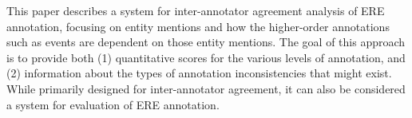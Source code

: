 This paper describes a system for inter-annotator agreement analysis of ERE annotation, focusing on entity mentions and how the higher-order annotations such as  events are dependent on those entity mentions.  The goal of this approach is to provide both (1) quantitative scores for the various levels of annotation, and (2) information about the types of annotation inconsistencies that might exist. While primarily designed for inter-annotator agreement, it can also be considered a system for evaluation of ERE annotation.
